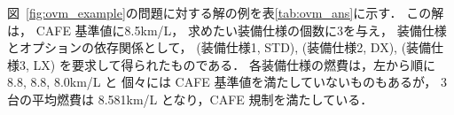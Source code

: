 図~\ref{fig:ovm_example}の問題に対する解の例を表\ref{tab:ovm_ans}に示す．
この解は，
CAFE 基準値に8.5km/L，
求めたい装備仕様の個数に3を与え，
装備仕様とオプションの依存関係として，
(装備仕様1, \textsf{STD}),
(装備仕様2, \textsf{DX}),
(装備仕様3, \textsf{LX})
を要求して得られたものである．
各装備仕様の燃費は，左から順に 8.8, 8.8, 8.0km/L と
個々には CAFE 基準値を満たしていないものもあるが，
3台の平均燃費は 8.581km/L となり，CAFE 規制を満たしている．
